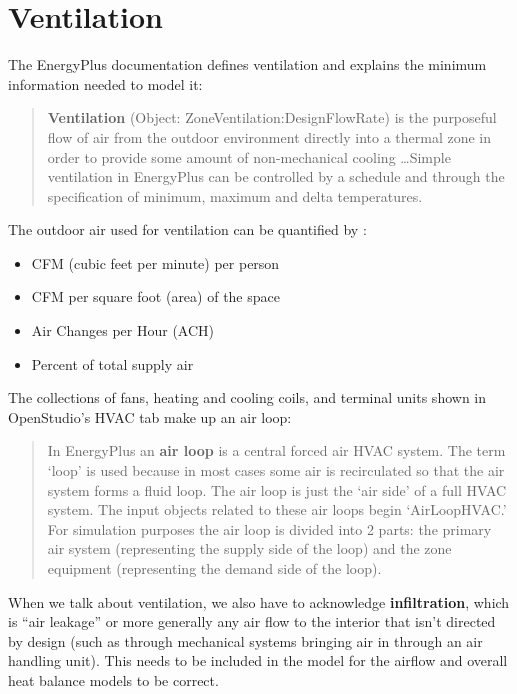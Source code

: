 \documentclass[10pt]{article}
\begin{document}
\section{Ventilation}

The EnergyPlus documentation defines ventilation and explains the minimum information needed to model it:

\begin{quote}
    \textbf{Ventilation} (Object: ZoneVentilation:DesignFlowRate) is the purposeful flow of air from the outdoor
environment directly into a thermal zone in order to provide some amount of non-mechanical
cooling \ldots Simple ventilation in EnergyPlus can be controlled by a schedule and through the
specification of minimum, maximum and delta temperatures. \cite{EPdocs9engineering}
\end{quote}

The outdoor air used for ventilation can be quantified by \cite{noauthor_undated-io}: 

\vspace{-6pt}
\begin{itemize}
    \setlength{\itemsep}{0pt}%
    \setlength{\parskip}{0pt}%
    \item CFM (cubic feet per minute) per person
    \item CFM per square foot (area) of the space
    \item Air Changes per Hour (ACH)
    \item Percent of total supply air
    \end{itemize}
    \vspace{-6pt}

The collections of fans, heating and cooling coils, and terminal units shown in OpenStudio's HVAC tab make up an air loop:

\begin{quote}
       In EnergyPlus an \textbf{air loop} is a central forced air HVAC system. The term `loop' is used because
in most cases some air is recirculated so that the air system forms a fluid loop. The air loop is
just the `air side' of a full HVAC system. The input objects related to these air loops begin
`AirLoopHVAC.'
For simulation purposes the air loop is divided into 2 parts: the primary air system (representing
the supply side of the loop) and the zone equipment (representing the demand side of the loop).
\end{quote}

 

When we talk about ventilation, we also have to acknowledge \textbf{infiltration}, which is ``air leakage'' or more generally any air flow to the interior that isn't directed by design (such as through mechanical systems bringing air in through an air handling unit). This needs to be included in the model for the airflow and overall heat balance models to be correct.
\end{document}
